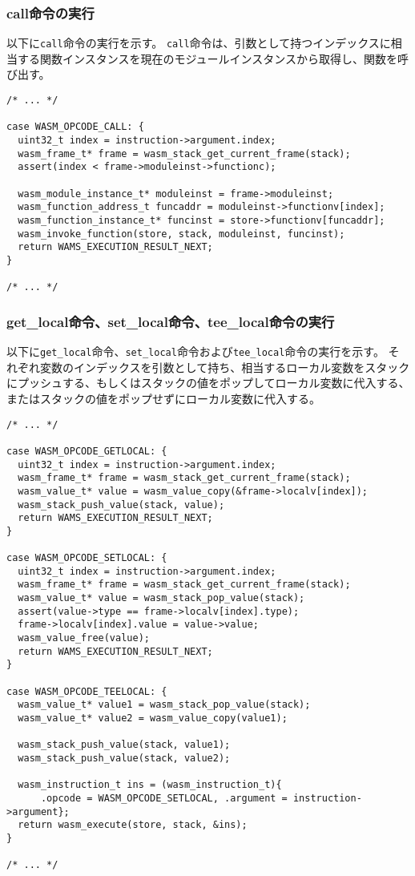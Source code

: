 \subsubsection{call命令の実行}

以下に\verb|call|命令の実行を示す。
\verb|call|命令は、引数として持つインデックスに相当する関数インスタンスを現在のモジュールインスタンスから取得し、関数を呼び出す。

\begin{lstlisting}[caption=命令の実装,label=lst:parse_sleb128]
/* ... */

case WASM_OPCODE_CALL: {
  uint32_t index = instruction->argument.index;
  wasm_frame_t* frame = wasm_stack_get_current_frame(stack);
  assert(index < frame->moduleinst->functionc);

  wasm_module_instance_t* moduleinst = frame->moduleinst;
  wasm_function_address_t funcaddr = moduleinst->functionv[index];
  wasm_function_instance_t* funcinst = store->functionv[funcaddr];
  wasm_invoke_function(store, stack, moduleinst, funcinst);
  return WAMS_EXECUTION_RESULT_NEXT;
}

/* ... */
\end{lstlisting}

\subsubsection{get\_local命令、set\_local命令、tee\_local命令の実行}

以下に\verb|get_local|命令、\verb|set_local|命令および\verb|tee_local|命令の実行を示す。
それぞれ変数のインデックスを引数として持ち、相当するローカル変数をスタックにプッシュする、もしくはスタックの値をポップしてローカル変数に代入する、またはスタックの値をポップせずにローカル変数に代入する。

\begin{lstlisting}[caption=命令の実装,label=lst:parse_sleb128]
/* ... */

case WASM_OPCODE_GETLOCAL: {
  uint32_t index = instruction->argument.index;
  wasm_frame_t* frame = wasm_stack_get_current_frame(stack);
  wasm_value_t* value = wasm_value_copy(&frame->localv[index]);
  wasm_stack_push_value(stack, value);
  return WAMS_EXECUTION_RESULT_NEXT;
}

case WASM_OPCODE_SETLOCAL: {
  uint32_t index = instruction->argument.index;
  wasm_frame_t* frame = wasm_stack_get_current_frame(stack);
  wasm_value_t* value = wasm_stack_pop_value(stack);
  assert(value->type == frame->localv[index].type);
  frame->localv[index].value = value->value;
  wasm_value_free(value);
  return WAMS_EXECUTION_RESULT_NEXT;
}

case WASM_OPCODE_TEELOCAL: {
  wasm_value_t* value1 = wasm_stack_pop_value(stack);
  wasm_value_t* value2 = wasm_value_copy(value1);

  wasm_stack_push_value(stack, value1);
  wasm_stack_push_value(stack, value2);

  wasm_instruction_t ins = (wasm_instruction_t){
      .opcode = WASM_OPCODE_SETLOCAL, .argument = instruction->argument};
  return wasm_execute(store, stack, &ins);
}

/* ... */
\end{lstlisting}

